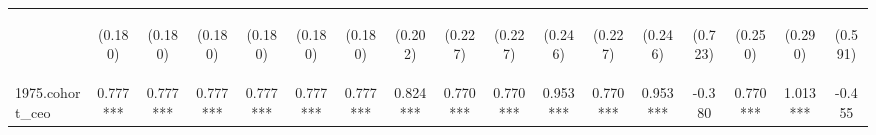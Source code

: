 \begin{center}
\begin{tabular}{lcccccccccccccccc}
\vspace{4pt} & \begin{footnotesize}(0.180)\end{footnotesize} & \begin{footnotesize}(0.180)\end{footnotesize} & \begin{footnotesize}(0.180)\end{footnotesize} & \begin{footnotesize}(0.180)\end{footnotesize} & \begin{footnotesize}(0.180)\end{footnotesize} & \begin{footnotesize}(0.180)\end{footnotesize} & \begin{footnotesize}(0.202)\end{footnotesize} & \begin{footnotesize}(0.227)\end{footnotesize} & \begin{footnotesize}(0.227)\end{footnotesize} & \begin{footnotesize}(0.246)\end{footnotesize} & \begin{footnotesize}(0.227)\end{footnotesize} & \begin{footnotesize}(0.246)\end{footnotesize} & \begin{footnotesize}(0.723)\end{footnotesize} & \begin{footnotesize}(0.250)\end{footnotesize} & \begin{footnotesize}(0.290)\end{footnotesize} & \begin{footnotesize}(0.591)\end{footnotesize} \\
1975.cohort\_ceo & 0.777*** & 0.777*** & 0.777*** & 0.777*** & 0.777*** & 0.777*** & 0.824*** & 0.770*** & 0.770*** & 0.953*** & 0.770*** & 0.953*** & -0.380 & 0.770*** & 1.013*** & -0.455 \\

\end{tabular}
\end{center}
